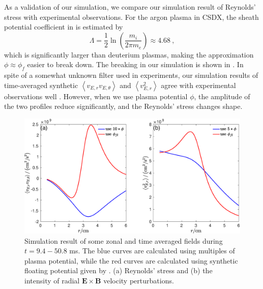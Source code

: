 \documentclass[aps,pre,twocolumn,superscriptaddress]{revtex4-1}
\begin{document}
As a validation of our simulation, we compare our simulation result of Reynolds' stress with experimental observations. For the argon plasma in CSDX, the sheath potential coefficient in  is estimated by \cite{Nie_2018}
\begin{equation}
	\Lambda=\frac{1}{2}\ln\left(\frac{m_{i}}{2\pi m_{e}}\right)\approx 4.68~,
\label{eq:Lamda}
\end{equation}
which is significantly larger than deuterium plasmas, making the approximation $\phi\approx\phi_{f}$ easier to break down. The breaking in our simulation is shown in . In spite of a somewhat unknown filter used in experiments, our simulation results of time-averaged synthetic $\left<v_{E,r}v_{E,\theta}\right>$ and $\left<v_{E,r}^{2}\right>$ agree with experimental observations well \cite{doi:10.1063/1.2985836,PhysRevLett.104.065002}. However, when we use plasma potential $\phi$, the amplitude of the two profiles reduce significantly, and the Reynolds' stress changes shape.

\begin{figure}[htb]
	\includegraphics[width=3.375 in]{comp_pl_fl.eps}
	\caption{
		Simulation result of some zonal and time averaged fields during $t=9.4-50.8$ ms. The blue curves are calculated using multiples of plasma potential, while the red curves are calculated using synthetic floating potential given by . (a) Reynolds' stress and (b) the intensity of radial $\bm{E}\times\bm{B}$ velocity perturbations.
		\label{fig:comp_pl_fl}	
	}
\end{figure}



\end{document}
